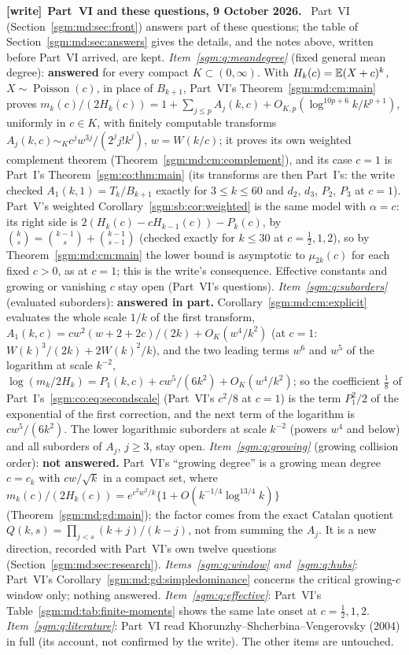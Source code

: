 \documentclass[11pt,letterpaper]{article}
\theoremstyle{remark}\newtheorem{remark}[theorem]{Remark}
\newcommand{\Poi}{\operatorname{Poisson}}\newcommand{\Bin}{\operatorname{Bin}}
\newenvironment{writenote}[1][]{\par\smallskip\begingroup\small
 \noindent\textbf{[write]}\if\relax\detokenize{#1}\relax\else~\textbf{#1.}\fi\ }%
 {\par\endgroup\smallskip}
\theoremstyle{definition}\newtheorem{definition}[theorem]{Definition}
\begin{document}
\begin{writenote}[Part~VI and these questions, 9 October 2026]
Part~VI (Section~\ref{sgm:md:sec:front}) answers part of these questions;
the table of Section~\ref{sgm:md:sec:answers} gives the details, and the
notes above, written before Part~VI arrived, are kept.
\emph{Item~\ref{sgm:q:meandegree}} (fixed general mean degree):
\textbf{answered} for every compact $K\subset(0,\infty)$. With
$H_k(c)=\mathbb E(X+c)^k$, $X\sim\Poi(c)$, in place of $B_{k+1}$, Part~VI's
Theorem~\ref{sgm:md:cm:main} proves
$m_k(c)/(2H_k(c))=1+\sum_{j\le p}A_j(k,c)+O_{K,p}(\log^{10p+6}k/k^{p+1})$,
uniformly in $c\in K$, with finitely computable transforms
$A_j(k,c)\sim_Kc^jw^{3j}/(2^jj!k^j)$, $w=W(k/c)$; it proves its own
weighted complement theorem (Theorem~\ref{sgm:md:cm:complement}), and its
case $c=1$ is Part~I's Theorem~\ref{sgm:co:thm:main} (its transforms are
then Part~I's: the write checked $A_1(k,1)=T_k/B_{k+1}$ exactly for
$3\le k\le60$ and $d_2$, $d_3$, $P_2$, $P_3$ at $c=1$). Part~V's weighted
Corollary~\ref{sgm:sb:cor:weighted} is the same model with $\alpha=c$: its
right side is $2(H_k(c)-cH_{k-1}(c))-P_k(c)$, by
$\binom ks=\binom{k-1}s+\binom{k-1}{s-1}$ (checked exactly for $k\le30$ at
$c=\frac12,1,2$), so by Theorem~\ref{sgm:md:cm:main} the lower bound is
asymptotic to $\mu_{2k}(c)$ for each fixed $c>0$, as at $c=1$; this is the
write's consequence. Effective constants and growing or vanishing $c$ stay
open (Part~VI's questions). \emph{Item~\ref{sgm:q:suborders}} (evaluated
suborders): \textbf{answered in part.}
Corollary~\ref{sgm:md:cm:explicit} evaluates the whole scale $1/k$ of the
first transform, $A_1(k,c)=cw^2(w+2+2c)/(2k)+O_K(w^4/k^2)$ (at $c=1$:
$W(k)^3/(2k)+2W(k)^2/k$), and the two leading terms $w^6$ and $w^5$ of the
logarithm at scale $k^{-2}$, $\log(m_k/2H_k)=P_1(k,c)+cw^5/(6k^2)+O_K(w^4/k^2)$;
so the coefficient $\frac18$ of Part~I's~\eqref{sgm:co:eq:secondscale}
(Part~VI's $c^2/8$ at $c=1$) is the term $P_1^2/2$ of the exponential of the
first correction, and the next term of the logarithm is $cw^5/(6k^2)$. The lower logarithmic suborders at scale $k^{-2}$ (powers
$w^4$ and below) and all suborders of $A_j$, $j\ge3$, stay open.
\emph{Item~\ref{sgm:q:growing}} (growing collision order): \textbf{not
answered.} Part~VI's ``growing degree'' is a growing mean degree $c=c_k$
with $cw/\sqrt k$ in a compact set, where
$m_k(c)/(2H_k(c))=e^{c^2w^2/k}\{1+O(k^{-1/4}\log^{13/4}k)\}$
(Theorem~\ref{sgm:md:gd:main}); the factor comes from the exact Catalan
quotient $Q(k,s)=\prod_{j<s}(k+j)/(k-j)$, not from summing the $A_j$. It is
a new direction, recorded with Part~VI's own twelve questions
(Section~\ref{sgm:md:sec:research}). \emph{Items~\ref{sgm:q:window}
and~\ref{sgm:q:hubs}}: Part~VI's Corollary~\ref{sgm:md:gd:simpledominance}
concerns the critical growing-$c$ window only; nothing answered.
\emph{Item~\ref{sgm:q:effective}}: Part~VI's Table~\ref{sgm:md:tab:finite-moments}
shows the same late onset at $c=\frac12,1,2$. \emph{Item~\ref{sgm:q:literature}}:
Part~VI read Khorunzhy--Shcherbina--Vengerovsky (2004) in full (its account,
not confirmed by the write). The other items are untouched.
\end{writenote}
\end{document}
